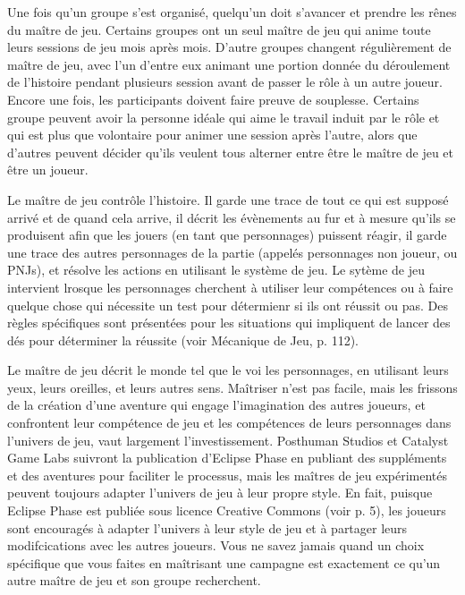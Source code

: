 Une fois qu'un groupe s'est organisé, quelqu'un doit s'avancer et prendre les rênes du maître de jeu. Certains groupes ont un seul maître de jeu qui anime toute leurs sessions de jeu mois après mois. D'autre groupes changent régulièrement de maître de jeu, avec l'un d'entre eux animant une portion donnée du déroulement de l'histoire pendant plusieurs session avant de passer le rôle à un autre joueur. Encore une fois, les participants doivent faire preuve de souplesse. Certains groupe peuvent avoir la personne idéale qui aime le travail induit par le rôle et qui est plus que volontaire pour animer une session après l'autre, alors que d'autres peuvent décider qu'ils veulent tous alterner entre être le maître de jeu et être un joueur. 

Le maître de jeu contrôle l'histoire. Il garde une trace de tout ce qui est supposé arrivé et de quand cela arrive, il décrit les évènements au fur et à mesure qu'ils se produisent afin que les jouers (en tant que personnages) puissent réagir, il garde une trace des autres personnages de la partie (appelés personnages non joueur, ou PNJs), et résolve les actions en utilisant le système de jeu. Le sytème de jeu intervient lrosque les personnages cherchent à utiliser leur compétences ou à faire quelque chose qui nécessite un test pour détermienr si ils ont réussit ou pas. Des règles spécifiques sont présentées pour les situations qui impliquent de lancer des dés pour déterminer la réussite (voir Mécanique de Jeu, p.  112). 

Le maître de jeu décrit le monde tel que le voi les personnages, en utilisant leurs yeux, leurs oreilles, et leurs autres sens. Maîtriser n'est pas facile, mais les frissons de la création d'une aventure qui engage l'imagination des autres joueurs, et confrontent leur compétence de jeu et les compétences de leurs personnages dans l'univers de jeu, vaut largement l'investissement. Posthuman Studios et Catalyst Game Labs suivront la publication d'Eclipse Phase en publiant des suppléments et des aventures pour faciliter le processus, mais les maîtres de jeu expérimentés peuvent toujours adapter l'univers de jeu à leur propre style. En fait, puisque Eclipse Phase est publiée sous licence Creative Commons (voir p. 5), les joueurs sont encouragés à adapter l'univers à leur style de jeu et à partager leurs modifcications avec les autres joueurs. Vous ne savez jamais quand un choix spécifique que vous faites en maîtrisant une campagne est exactement ce qu'un autre maître de jeu et son groupe recherchent. 

